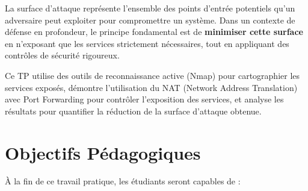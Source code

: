 \documentclass[12pt,a4paper,openany]{report}
\begin{document}
	La surface d'attaque représente l'ensemble des points d'entrée potentiels qu'un adversaire peut exploiter pour compromettre un système. Dans un contexte de défense en profondeur, le principe fondamental est de \textbf{minimiser cette surface} en n'exposant que les services strictement nécessaires, tout en appliquant des contrôles de sécurité rigoureux.
	
	Ce TP utilise des outils de reconnaissance active (Nmap) pour cartographier les services exposés, démontre l'utilisation du NAT (Network Address Translation) avec Port Forwarding pour contrôler l'exposition des services, et analyse les résultats pour quantifier la réduction de la surface d'attaque obtenue.
	
	\section{Objectifs Pédagogiques}
	À la fin de ce travail pratique, les étudiants seront capables de :
	
\end{document}
